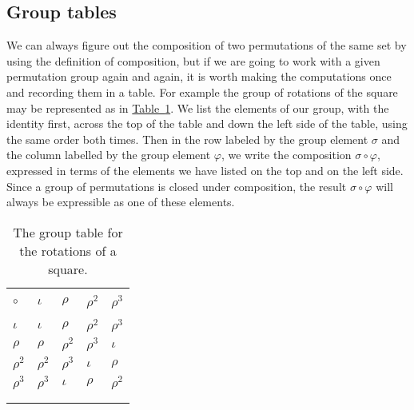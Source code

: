 \documentclass[10pt,]{book}
\theoremstyle{plain}
\theoremstyle{definition}
\numberwithin{equation}{chapter}
\newcommand{\hrulethin}  {\noalign{\hrule height 0.04em}}
\begin{document}
\subsection[{Group tables}]{Group tables}\label{subsection-62}
We can always figure out the composition of two permutations of the same set by using the definition of composition, but if we are going to work with a given permutation group again and again, it is worth making the computations once and recording them in a table. For example the group of rotations of the square may be represented as in \hyperref[rotationgrouptable]{Table~\ref{rotationgrouptable}}. We list the elements of our group, with the identity first, across the top of the table and down the left side of the table, using the same order both times. Then in the row labeled by the group element \(\sigma\) and the column labelled by the group element \(\varphi\), we write the composition \(\sigma\circ \varphi\), expressed in terms of the elements we have listed on the top and on the left side. Since a group of permutations is closed under composition, the result \(\sigma\circ \varphi\) will always be expressible as one of these elements.%
\begin{table}
\centering
\begin{tabular}{lllll}
&&&&\tabularnewline\hrulethin
\(\circ\)&\(\iota\)&\(\rho\)&\(\rho^2\)&\(\rho^3\)\tabularnewline[0pt]
&&&&\tabularnewline\hrulethin
\(\iota\)&\(\iota\)&\(\rho\)&\(\rho^2\)&\(\rho^3\)\tabularnewline[0pt]
\(\rho\)&\(\rho\)&\(\rho^2\)&\(\rho^3\)&\(\iota\)\tabularnewline[0pt]
\(\rho^2\)&\(\rho^2\)&\(\rho^3\)&\(\iota\)&\(\rho\)\tabularnewline[0pt]
\(\rho^3\)&\(\rho^3\)&\(\iota\)&\(\rho\)&\(\rho^2\)\tabularnewline[0pt]
&&&&\tabularnewline\hrulethin
\end{tabular}
\caption{The group table for the rotations of a square.\label{rotationgrouptable}}
\end{table}
\end{document}
